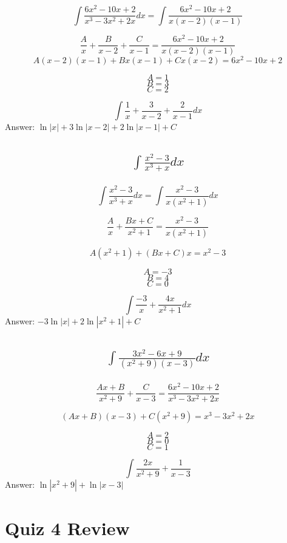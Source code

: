 \documentclass{article}
\begin{document}
\[ \int{\frac{6x^2 - 10x + 2}{x^3 - 3x^2 + 2x} dx} = \int \frac{6x^2 - 10x + 2}{x(x-2)(x-1)}\]

\bigskip

\[ \frac{A}{x} + \frac{B}{x-2} + \frac{C}{x-1} = \frac{6x^2 - 10x + 2}{x(x-2)(x-1)} \]
\[ A(x-2)(x-1) +Bx(x-1) +Cx(x-2) = 6x^2 - 10x + 2 \]

\[A=1\]
\[B = 3\]
\[C = 2\]

\bigskip

\[ \int \frac{1}{x} +\frac{3}{x-2} + \frac{2}{x-1} dx\]
Answer: $\ln{|x|} +3 \ln{|x-2|} + 2 \ln {|x-1|} +C$


\subsection{
	\begin{align*}
		\int{\frac{x^2 - 3}{x^3 + x} dx}
	\end{align*} 
}

\[ \int{\frac{x^2 - 3}{x^3 + x} dx} = \int \frac{x^2-3}{x(x^2+1)} dx \]

\bigskip

\[ \frac{A}{x} +\frac{Bx+C}{x^2+1} = \frac{x^2-3}{x(x^2+1)} \]

\[ A(x^2+1) + (Bx+C)x = x^2-3\]

\[A = -3\]
\[B=4\]
\[C = 0\]

\[ \int \frac{-3}{x} +\frac{4x}{x^2+1} dx\]
Answer: $-3 \ln {|x|} + 2 \ln {|x^2+1|} +C$

\subsection{
	\begin{align*}
		\int{\frac{3x^2 - 6x + 9}{(x^2 + 9)(x - 3)} dx}
	\end{align*}
}



\[ \frac{Ax+B}{x^2 +9} + \frac{C}{x-3} = \frac{6x^2 - 10x + 2}{x^3 - 3x^2 + 2x} \]

\[ (Ax+B)(x-3) + C(x^2+9) = x^3 - 3x^2 + 2x\]

\[A = 2\]
\[B=0\]
\[C=1\]

\bigskip 

\[ \int \frac{2x}{x^2+9} + \frac{1}{x-3} \]
Answer: $\ln {|x^2+9|} +\ln {|x-3|}$




\newpage
\section{Quiz 4 Review}
\end{document}
